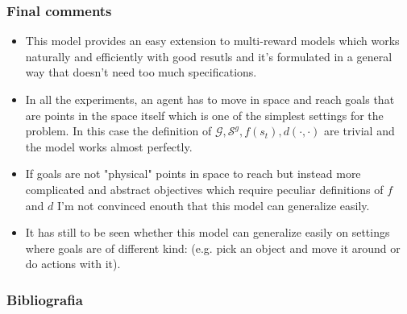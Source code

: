 \documentclass{beamer}
\theoremstyle{plain}
\theoremstyle{definition}
\theoremstyle{remark}
\begin{document}
\begin{frame}
	\frametitle{Final comments}
	\begin{itemize}
		\item This model provides an easy extension to multi-reward models which works naturally and efficiently with good resutls and it's formulated in a general way that doesn't need too much specifications.
		\item In all the experiments, an agent has to move in space and reach goals that are points in the space itself which is one of the simplest settings for the problem. In this case the definition of $\mathcal{G},\mathcal{S}^g, f(s_t), d(\cdot,\cdot)$ are trivial and the model works almost perfectly.
		\item If goals are not "physical" points in space to reach but instead more complicated and abstract objectives which require peculiar definitions of $f$ and $d$ I'm not convinced enouth that this model can generalize easily.
		\item It has still to be seen whether this model can generalize easily on settings where goals are of different kind: (e.g. pick an object and move it around or do actions with it).
	\end{itemize}
\end{frame}

\nocite{AGG}

\begin{frame}[allowframebreaks]
	\frametitle{Bibliografia}
	
	
\end{frame}



\end{document}
